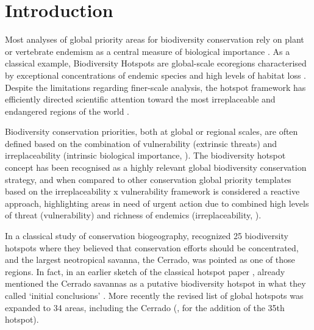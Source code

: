 \documentclass[12pt,openright,oneside,a4paper,english]{abntex2}
\begin{document}
\section{Introduction}
Most analyses of global priority areas for biodiversity conservation rely on plant or vertebrate endemism as a central measure of biological importance \citep{Brooks2006}. As a classical example, Biodiversity Hotspots are global-scale ecoregions characterised by exceptional concentrations of endemic species and high levels of habitat loss \citep{Myers1988, Myers1990, Mittermeier1998, Myers2000}. Despite the limitations regarding finer-scale analysis, the hotspot framework has efficiently directed scientific attention toward the most irreplaceable and endangered regions of the world \citep{Reid1998, Brooks2006}.

Biodiversity conservation priorities, both at global or regional scales, are often defined based on the combination of vulnerability (extrinsic threats) and irreplaceability (intrinsic biological importance, \citealp[see][]{Brooks2006}). The biodiversity hotspot concept has been recognised as a highly relevant global biodiversity conservation strategy, and when compared to other conservation global priority templates based on the irreplaceability x vulnerability framework \citep{Ginsberg1999, Brooks2006} is considered a reactive approach, highlighting areas in need of urgent action due to combined high levels of threat (vulnerability) and richness of endemics (irreplaceability, \citealp{Brooks2006}).

In a classical study of conservation biogeography, \citet{Myers2000} recognized 25 biodiversity hotspots where they believed that conservation efforts should be concentrated, and the largest neotropical savanna, the Cerrado, was pointed as one of those regions. In fact, in an earlier sketch of the classical hotspot paper \citep{Myers2000}, \citet{Mittermeier1998} already mentioned the Cerrado savannas as a putative biodiversity hotspot in what they called ‘initial conclusions’ \citep{Mittermeier1998}. More recently the revised list of global hotspots \citep{Mittermeier2004} was expanded to 34 areas, including the Cerrado (\citealp[see also][]{Willians2011}, for the addition of the 35th hotspot).
\end{document}
